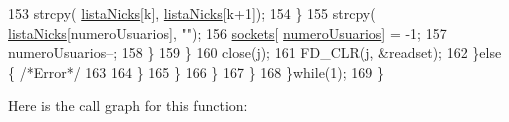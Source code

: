 \begin{DoxyCode}
153                                                                         strcpy(
      \hyperlink{_g-2361-06-_p1-_server_8c_a713172366a6be2fbf8456a4b43702603}{listaNicks}[k], \hyperlink{_g-2361-06-_p1-_server_8c_a713172366a6be2fbf8456a4b43702603}{listaNicks}[k+1]);
154                                                                 \}
155                                                                 strcpy(
      \hyperlink{_g-2361-06-_p1-_server_8c_a713172366a6be2fbf8456a4b43702603}{listaNicks}[numeroUsuarios], \textcolor{stringliteral}{""});
156                                                                 \hyperlink{_g-2361-06-_p1-_server_8c_a7724e53f22e431d1ecb6516951a172e1}{sockets}[
      \hyperlink{_g-2361-06-_p1-_server_8c_ac9a5ec6f534d2a8e2a870179807d32dc}{numeroUsuarios}] = -1;
157                                                                 numeroUsuarios--;
158                                                         \}
159                                                 \}
160                                                 close(j);
161                                 FD\_CLR(j, &readset);
162                             \}\textcolor{keywordflow}{else} \{ \textcolor{comment}{/*Error*/}
163 
164                             \}
165                         \}      
166                 \}     
167                 \}
168         \}\textcolor{keywordflow}{while}(1);
169 \}
\end{DoxyCode}


Here is the call graph for this function\+:


